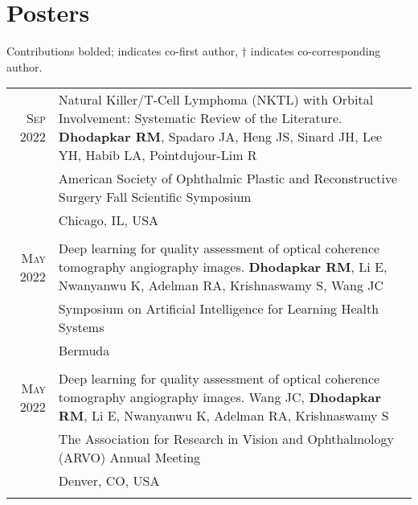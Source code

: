 \documentclass[a4paper,10pt]{article}
\begin{document}
\newpage
\section{Posters}
Contributions bolded; {\bf *} indicates co-first author, {\bf $\dag$} indicates co-corresponding author.

\begin{tabular}{rp{11cm}}
 \textsc{Sep} 2022 & Natural Killer/T-Cell Lymphoma (NKTL) with Orbital Involvement: Systematic Review of the Literature. {\bf Dhodapkar RM}, Spadaro JA, Heng JS, Sinard JH, Lee YH, Habib LA, Pointdujour-Lim R \\
 								 & American Society of Ophthalmic Plastic and Reconstructive Surgery Fall Scientific Symposium \\
 								 & Chicago, IL, USA  \\
 \multicolumn{2}{c}{} \\
 \textsc{May} 2022 & Deep learning for quality assessment of optical coherence tomography angiography
images. {\bf Dhodapkar RM}, Li E, Nwanyanwu K, Adelman RA, Krishnaswamy S, Wang JC \\
 								 & Symposium on Artificial Intelligence for Learning Health Systems \\
 								 & Bermuda  \\
 \multicolumn{2}{c}{} \\
 \textsc{May} 2022 & Deep learning for quality assessment of optical coherence tomography angiography
images. Wang JC, {\bf Dhodapkar RM}, Li E, Nwanyanwu K, Adelman RA, Krishnaswamy S\\
 								 & The Association for Research in Vision and Ophthalmology (ARVO) Annual Meeting \\
 								 & Denver, CO, USA  \\
 \multicolumn{2}{c}{} \\


\end{tabular}
\end{document}
